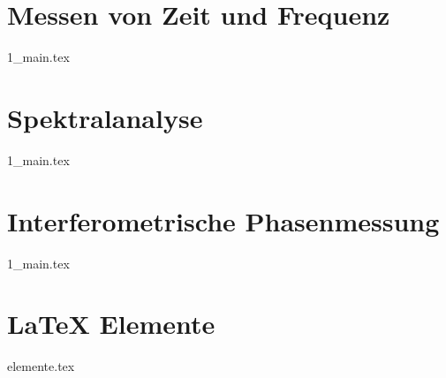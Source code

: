 \part{Messen von Zeit und Frequenz}
{1_main.tex}

\part{Spektralanalyse}
{1_main.tex}

\part{Interferometrische Phasenmessung}
{1_main.tex}

\part{LaTeX Elemente}
{elemente.tex}